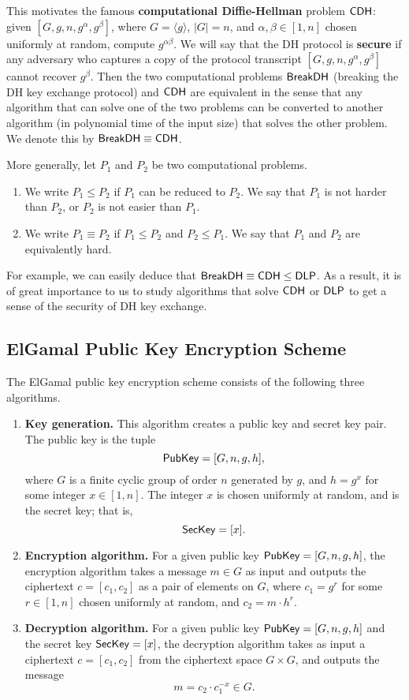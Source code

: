 This motivates the famous {\bf computational Diffie-Hellman} problem ${\sf CDH}$: given 
$[G, g, n, g^\alpha, g^\beta]$, where $G = \langle g \rangle$, $|G| = n$, 
and $\alpha, \beta \in [1, n]$ chosen uniformly at random, compute $g^{\alpha\beta}$. 
We will say that the DH protocol is {\bf secure} if any adversary who captures a 
copy of the protocol transcript $[G, g, n, g^\alpha, g^\beta]$ cannot recover 
$g^\beta$. Then the two computational problems ${\sf BreakDH}$ (breaking the DH 
key exchange protocol) and ${\sf CDH}$ are equivalent in the sense that any algorithm 
that can solve one of the two problems can be converted to another algorithm 
(in polynomial time of the input size) that solves the other problem. We denote this 
by ${\sf BreakDH} \equiv {\sf CDH}$. 

More generally, let $P_1$ and $P_2$ be two computational problems. 
\begin{enumerate}[(1)]
    \item We write $P_1 \leq P_2$ if $P_1$ can be reduced to $P_2$. We say that 
          $P_1$ is not harder than $P_2$, or $P_2$ is not easier than $P_1$. 
    \item We write $P_1 \equiv P_2$ if $P_1 \leq P_2$ and $P_2 \leq P_1$. 
          We say that $P_1$ and $P_2$ are equivalently hard. 
\end{enumerate}

For example, we can easily deduce that ${\sf BreakDH} \equiv {\sf CDH} \leq {\sf DLP}$. 
As a result, it is of great importance to us to study algorithms that solve 
${\sf CDH}$ or ${\sf DLP}$ to get a sense of the security of DH key exchange. 

\subsection{ElGamal Public Key Encryption Scheme}
The ElGamal public key encryption scheme consists of the following three algorithms. 

\begin{enumerate}
    \item {\bf Key generation.} This algorithm creates a public key and secret key 
          pair. The public key is the tuple 
          \[ {\sf PubKey} = [G, n, g, h], \] 
          where $G$ is a finite cyclic group of order $n$ generated by $g$, and 
          $h = g^x$ for some integer $x \in [1, n]$. The integer $x$ is chosen 
          uniformly at random, and is the secret key; that is, 
          \[ {\sf SecKey} = [x]. \] 
    \item {\bf Encryption algorithm.} For a given public key ${\sf PubKey} = 
          [G, n, g, h]$, the encryption algorithm takes a message $m \in G$ as 
          input and outputs the ciphertext $c = [c_1, c_2]$ as a pair of elements 
          on $G$, where $c_1 = g^r$ for some $r \in [1, n]$ chosen uniformly 
          at random, and $c_2 = m \cdot h^r$. 
    \item {\bf Decryption algorithm.} For a given public key ${\sf PubKey} = 
          [G, n, g, h]$ and the secret key ${\sf SecKey} = [x]$, the decryption 
          algorithm takes as input a ciphertext $c = [c_1, c_2]$ from the 
          ciphertext space $G \times G$, and outputs the message 
          \[ m = c_2 \cdot c_1^{-x} \in G. \] 
\end{enumerate}

